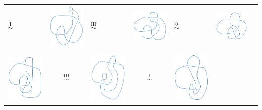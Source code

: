 \documentclass[10pt]{article}
\begin{document}
\begin{center}
\begin{tabular}{ m{9em} c m{9em} c m{9em} c m{9em} }
		$\overset{\text{I}}{\sim}$&
		\includegraphics[width=9em]{figs/b2e125_7.png}&
		$\overset{\text{III}}{\sim}$&
		\includegraphics[width=9em]{figs/b2e125_6.png}&
		$\overset{\text{0}}{\sim}$&
		\includegraphics[width=9em]{figs/b2e125_5.png}\\
		\rotatebox[origin=c]{90}{$\sim$}\text{\scriptsize{0}}&&&&&&\\
		\includegraphics[width=9em]{figs/b2e125_9.png}&
		$\overset{\text{III}}{\sim}$&
		\includegraphics[width=9em]{figs/b2e125_10.png}&
		$\overset{\text{I}}{\sim}$&
		\includegraphics[width=9em]{figs/b2e125_11.png}&

\end{tabular}
\end{center}
\end{document}
